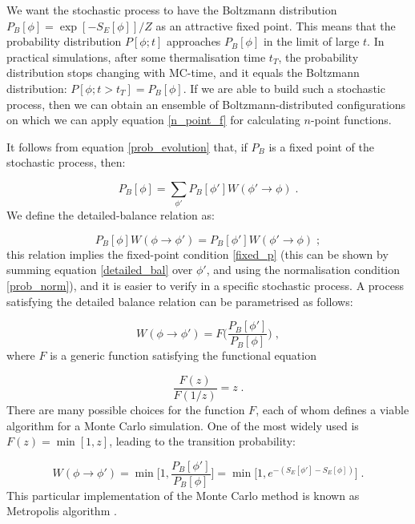 We want the stochastic process to have the Boltzmann distribution $P_B[\phi] = \exp[-S_E[\phi]]/Z$ as an attractive fixed point. This means that the probability distribution $P[\phi; t]$ approaches $P_B[\phi]$ in the limit of large $t$. In practical simulations, after some thermalisation time $t_T$, the probability distribution stops changing with MC-time, and it equals the Boltzmann distribution: $P[\phi; t>t_T] = P_B[\phi]$. If we are able to build such a stochastic process, then we can obtain an ensemble of Boltzmann-distributed configurations on which we can apply equation \ref{n_point_f} for calculating $n$-point functions.

It follows from equation \ref{prob_evolution} that, if $P_B$ is a fixed point of the stochastic process, then:

\begin{equation}
P_B[\phi] = \sum_{\phi'} P_B[\phi'] W(\phi' \to \phi) \; .
\label{fixed_p}
\end{equation}
%
We define the detailed-balance relation as:

\begin{equation}
P_B[\phi] W(\phi \to \phi') = P_B[\phi'] W(\phi' \to \phi) \; ;
\label{detailed_bal}
\end{equation}
%
this relation implies the fixed-point condition \ref{fixed_p} (this can be shown by summing equation \ref{detailed_bal} over $\phi'$, and using the normalisation condition \ref{prob_norm}), and it is easier to verify in a specific stochastic process. A process satisfying the detailed balance relation can be parametrised as follows:

\begin{equation}
W(\phi \to \phi') = F\biggl(\frac{P_B[\phi']}{P_B[\phi]} \biggr) \; ,
\label{F1}
\end{equation}
%
where $F$ is a generic function satisfying the functional equation

\begin{equation}
\frac{F(z)}{F(1/z)} = z \; .
\label{F2}
\end{equation}
%
There are many possible choices for the function $F$, each of whom defines a viable algorithm for a Monte Carlo simulation. One of the most widely used is $F(z) = \min [1,z]$, leading to the transition probability:

\begin{equation}
W(\phi \to \phi') = \min\biggl[1, \frac{P_B[\phi']}{P_B[\phi]}\biggl] = \min\bigl[1,e^{-(S_E[\phi'] - S_E[\phi])}\bigr] \; .
\label{Metropolis}
\end{equation}
%
This particular implementation of the Monte Carlo method is known as Metropolis algorithm \cite{Metropolis:1953am}.

